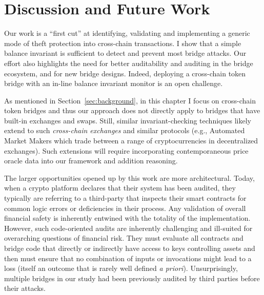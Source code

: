 \section{Discussion and Future Work}

\label{sec:discuss}
Our work is a ``first cut'' at identifying, validating and implementing a
generic mode of theft protection into cross-chain transactions. I show that a
simple balance invariant is sufficient to detect and prevent most bridge
attacks. Our effort also highlights the need for better auditability and
auditing in the bridge ecosystem, and for new bridge designs.  Indeed, deploying a cross-chain token bridge with an in-line balance invariant
monitor is an open challenge.

As mentioned in Section~\ref{sec:background}, in this chapter I focus on
cross-chain token bridges and thus our approach does not directly apply to
bridges that have built-in exchanges and swaps.  Still, similar
invariant-checking techniques likely extend to such \emph{cross-chain exchanges}
and similar protocols (e.g., Automated Market Makers which trade between a
range of cryptocurrencies in decentralized exchanges). Such extensions will
require incorporating contemporaneous price oracle data
into our framework
and addition reasoning.

The larger opportunities opened up by this work are
more architectural.  Today, when a crypto platform declares that their
system has been audited, they typically are referring to a third-party
that inspects their smart contracts for common logic errors or
deficiencies in their process.  Any validation of overall financial
safety is inherently entwined with the totality of the implementation.
However, such code-oriented audits are inherently challenging and
ill-suited for overarching questions of financial risk.  They must
evaluate all contracts and bridge code that directly or indirectly
have access to keys controlling assets and then must ensure that no
combination of inputs or invocations might lead to a loss (itself an
outcome that is rarely well defined \emph{a priori}).  Unsurprisingly,
multiple bridges in our study had been previously audited by third
parties before their attacks.

